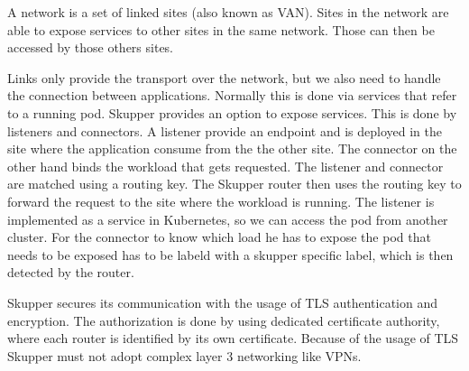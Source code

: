 A network is a set of linked sites (also known as VAN).
Sites in the network are able to expose services to other sites in the same network.
Those can then be accessed by those others sites.

Links only provide the transport over the network, but we also need to handle the connection between applications.
Normally this is done via services that refer to a running pod.
Skupper provides an option to expose services.
This is done by listeners and connectors.
A listener provide an endpoint and is deployed in the site where the application consume from the the other site. 
The connector on the other hand binds the workload that gets requested.
The listener and connector are matched using a routing key.
The Skupper router then uses the routing key to forward the request to the site where the workload is running.
The listener is implemented as a service in Kubernetes, so we can access the pod from another cluster.
For the connector to know which load he has to expose the pod that needs to be exposed has to be labeld with a skupper specific label, which is then detected by the router.

Skupper secures its communication with the usage of TLS authentication and encryption.
The authorization is done by using dedicated certificate authority, where each router is identified by its own certificate.
Because of the usage of TLS Skupper must not adopt complex layer 3 networking like VPNs.







